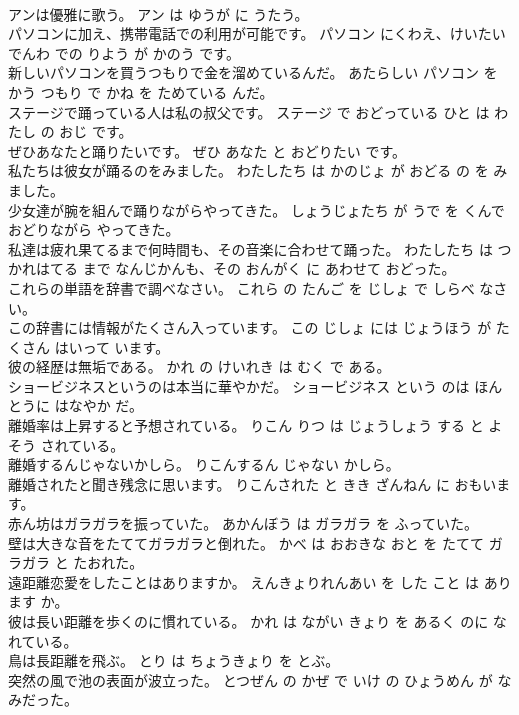 \documentclass[8pt]{extreport}
\begin{document}
\begin{CJK}{UTF8}{min}
\\	アンは優雅に歌う。	アン は ゆうが に うたう。	
\\	パソコンに加え、携帯電話での利用が可能です。	パソコン にくわえ、けいたいでんわ での りよう が かのう です。	
\\	新しいパソコンを買うつもりで金を溜めているんだ。	あたらしい パソコン を かう つもり で かね を ためている んだ。	
\\	ステージで踊っている人は私の叔父です。	ステージ で おどっている ひと は わたし の おじ です。	
\\	ぜひあなたと踊りたいです。	ぜひ あなた と おどりたい です。	
\\	私たちは彼女が踊るのをみました。	わたしたち は かのじょ が おどる の を みました。	
\\	少女達が腕を組んで踊りながらやってきた。	しょうじょたち が うで を くんで おどりながら やってきた。	
\\	私達は疲れ果てるまで何時間も、その音楽に合わせて踊った。	わたしたち は つかれはてる まで なんじかんも、その おんがく に あわせて おどった。	
\\	これらの単語を辞書で調べなさい。	これら の たんご を じしょ で しらべ なさい。	
\\	この辞書には情報がたくさん入っています。	この じしょ には じょうほう が たくさん はいって います。	
\\	彼の経歴は無垢である。	かれ の けいれき は むく で ある。	
\\	ショービジネスというのは本当に華やかだ。	ショービジネス という のは ほんとうに はなやか だ。	
\\	離婚率は上昇すると予想されている。	りこん りつ は じょうしょう する と よそう されている。	
\\	離婚するんじゃないかしら。	りこんするん じゃない かしら。	
\\	離婚されたと聞き残念に思います。	りこんされた と きき ざんねん に おもいます。	
\\	赤ん坊はガラガラを振っていた。	あかんぼう は ガラガラ を ふっていた。	
\\	壁は大きな音をたててガラガラと倒れた。	かべ は おおきな おと を たてて ガラガラ と たおれた。	
\\	遠距離恋愛をしたことはありますか。	えんきょりれんあい を した こと は あります か。	
\\	彼は長い距離を歩くのに慣れている。	かれ は ながい きょり を あるく のに なれている。	
\\	鳥は長距離を飛ぶ。	とり は ちょうきょり を とぶ。	
\\	突然の風で池の表面が波立った。	とつぜん の かぜ で いけ の ひょうめん が なみだった。	

\end{CJK}
\end{document}
